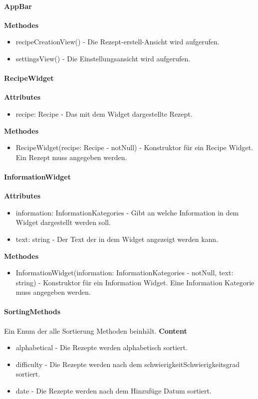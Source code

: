 \documentclass[parskip=full]{scrartcl}
\begin{document}
\paragraph{AppBar}
\textbf{Methodes}
\begin{itemize}
    \item recipeCreationView() - Die Rezept-erstell-Ansicht wird aufgerufen.
    \item settingsView() - Die Einstellungsansicht wird aufgerufen.
\end{itemize}

\paragraph{RecipeWidget}
\textbf{Attributes}
\begin{itemize}
    \item recipe: Recipe - Das mit dem Widget dargestellte Rezept.
\end{itemize}
\textbf{Methodes}
\begin{itemize}
    \item RecipeWidget(recipe: Recipe - notNull) - Konstruktor für ein Recipe Widget. Ein Rezept muss angegeben werden.
\end{itemize}

\paragraph{InformationWidget}
\label{sec:InformationWidget}
\textbf{Attributes}
\begin{itemize}
    \item information: InformationKategories - Gibt an welche Information in dem Widget dargestellt werden soll.
    \item text: string - Der Text der in dem Widget angezeigt werden kann.
\end{itemize}

\textbf{Methodes}
\begin{itemize}
    \item InformationWidget(information: InformationKategories - notNull, text: string) - Konstruktor für ein Information Widget. Eine Information Kategorie muss angegeben werden.
\end{itemize}

\paragraph{SortingMethods}
Ein Enum der alle Sortierung Methoden beinhält.
\textbf{Content}
\begin{itemize}
    \item  alphabetical - Die Rezepte werden alphabetisch sortiert.
    \item  difficulty - Die Rezepte werden nach dem \gls{schwierigkeit}{Schwierigkeitsgrad} sortiert.
    \item  date - Die Rezepte werden nach dem Hinzufüge Datum sortiert.
\end{itemize}
\end{document}
